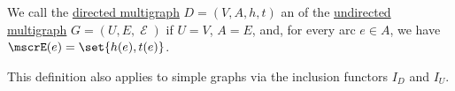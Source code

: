 \begin{definition}\label{def:multigraph_orientation}
  We call the \hyperref[def:directed_multigraph]{directed multigraph} \( D = (V, A, h, t) \) an  of the \hyperref[def:undirected_multigraph]{undirected multigraph} \( G = (U, E, \mscrE) \) if \( U = V \), \( A = E \), and, for every arc \( e \in A \), we have \( \mscrE(e) = \set{ h(e), t(e) } \).
\end{definition}
\begin{comments}
  \item This definition also applies to simple graphs via the inclusion functors \hyperref[def:graph_functors/directed_inclusion]{\( I_D \)} and \hyperref[def:graph_functors/undirected_inclusion]{\( I_U \)}.
\end{comments}

